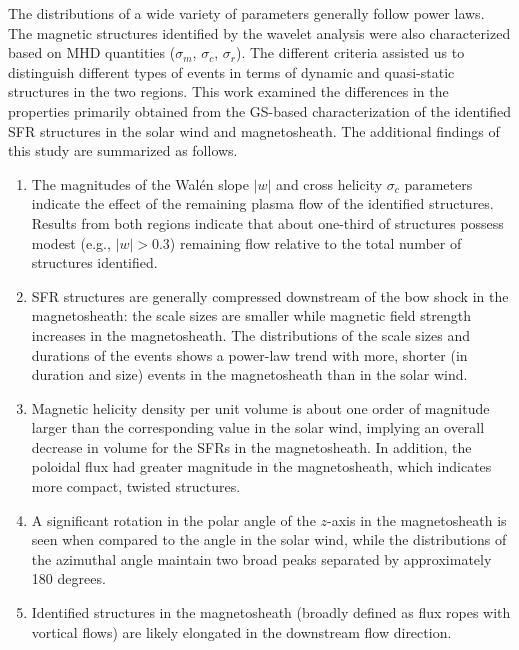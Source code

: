 The distributions of a wide variety of parameters generally follow power laws. The magnetic structures identified by the wavelet analysis were also characterized based on MHD quantities ($\sigma_m$, $\sigma_c$, $\sigma_r$). The different criteria assisted us to distinguish different types of events in terms of dynamic and quasi-static structures in the two regions. This work examined the differences in the properties primarily obtained from the GS-based characterization of the identified SFR structures in the solar wind and magnetosheath. The additional findings of this study are summarized as follows.
\begin{enumerate}
    \item The magnitudes of the Wal\'en slope $|w|$ and cross helicity $\sigma_c$ parameters indicate the effect of the remaining plasma flow of the identified structures. Results from both regions indicate that about one-third of structures possess modest (e.g., $|w|>0.3$) remaining flow relative to the total number of structures identified.
    \item SFR structures are generally compressed downstream of the bow shock in the magnetosheath: the scale sizes are smaller while magnetic field strength increases in the magnetosheath. The distributions of the scale sizes and durations of the events shows a power-law trend with more, shorter (in duration and size) events in the magnetosheath than in the solar wind.
    \item Magnetic helicity density per unit volume is about one order of magnitude larger than the corresponding value in the solar wind, implying an overall decrease in volume for the SFRs in the magnetosheath. In addition, the poloidal flux had greater magnitude in the magnetosheath, which indicates more compact, twisted structures.
    \item A significant rotation in the polar angle of the $z$-axis in the magnetosheath is seen when compared to the angle in the solar wind, while the distributions of the azimuthal angle maintain two broad peaks separated by approximately 180 degrees.
    \item Identified structures in the magnetosheath (broadly defined as flux ropes with vortical flows) are likely elongated in the downstream flow direction.
\end{enumerate}

